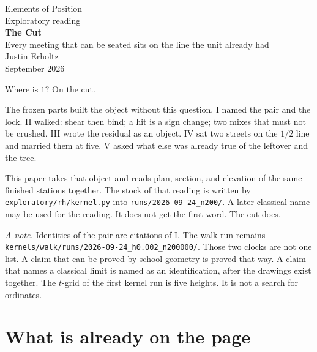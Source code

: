 \documentclass[10pt,a4paper]{article}
\theoremstyle{plain}
\theoremstyle{definition}
\theoremstyle{remark}
\begin{document}
\begin{center}
\vspace*{1.6em}
{\large Elements of Position}\\[0.6em]
{\small Exploratory reading}\\[1.2em]
{\LARGE\bfseries The Cut}\\[0.5em]
{\small Every meeting that can be seated sits on the line the unit already had}\\[1.6em]
{\normalsize Justin Erholtz}\\[0.25em]
{\small September 2026}
\end{center}

\vspace{1.0em}

\begin{center}
{\large Where is \(1\)? On the cut.}
\end{center}

\vspace{0.9em}

\noindent
The frozen parts built the object without this question.
I named the pair and the lock.
II walked: shear then bind; a hit is a sign change; two mixes that must not be crushed.
III wrote the residual as an object.
IV sat two streets on the \(1/2\) line and married them at five.
V asked what else was already true of the leftover and the tree.

This paper takes that object and reads plan, section, and elevation of the same finished stations together.
The stock of that reading is written by
\texttt{exploratory/rh/kernel.py}
into
\texttt{runs/2026-09-24\_n200/}.
A later classical name may be used for the reading.
It does not get the first word.
The cut does.

\vspace{0.7em}
\noindent
\textit{A note.}
Identities of the pair are citations of I.
The walk run remains
\texttt{kernels/walk/runs/2026-09-24\_h0.002\_n200000/}.
Those two clocks are not one list.
A claim that can be proved by school geometry is proved that way.
A claim that names a classical limit is named as an identification, after the drawings exist together.
The \(t\)-grid of the first kernel run is five heights.
It is not a search for ordinates.

\tableofcontents

\section{What is already on the page}
\end{document}
